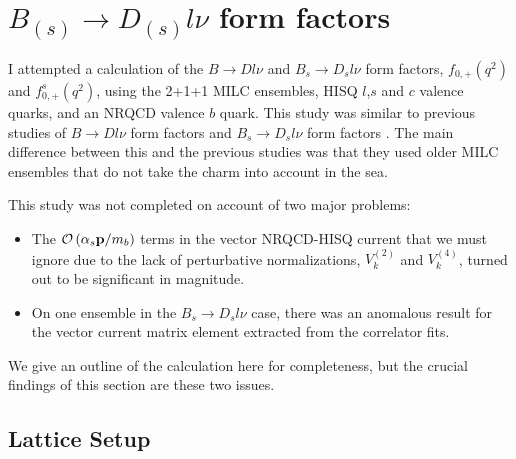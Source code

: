 \section{$B_{(s)}\to D_{(s)}l\nu$ form factors}
\label{sec:BD_BsDs_nrqcd}

I attempted a calculation of the $B\to Dl\nu$ and $B_{s}\to D_{s}l\nu$ form factors, $f_{0,+}(q^2)$ and $f^s_{0,+}(q^2)$, using the 2+1+1 MILC ensembles, HISQ $l$,$s$ and $c$ valence quarks, and an NRQCD valence $b$ quark. This study was similar to previous studies of $B\to Dl\nu$ form factors \cite{Na:2015kha} and $B_s\to D_sl\nu$ form factors \cite{Monahan:2017uby}. The main difference between this and the previous studies was that they used older MILC ensembles that do not take the charm into account in the sea.

This study was not completed on account of two major problems:
\begin{itemize}
  \item
    The $\mathcal{O}\left( \alpha_s{\textbf{p}}/m_b \right)$ terms in the vector NRQCD-HISQ current that we must ignore due to the lack of perturbative normalizations, $V_{k}^{(2)}$ and $V_{k}^{(4)}$, turned out to be significant in magnitude.
  \item
    On one ensemble in the $B_s\to D_s l\nu$ case, there was an anomalous result for the vector current matrix element extracted from the correlator fits.
\end{itemize}
We give an outline of the calculation here for completeness, but the crucial findings of this section are these two issues.

\subsection{Lattice Setup}

